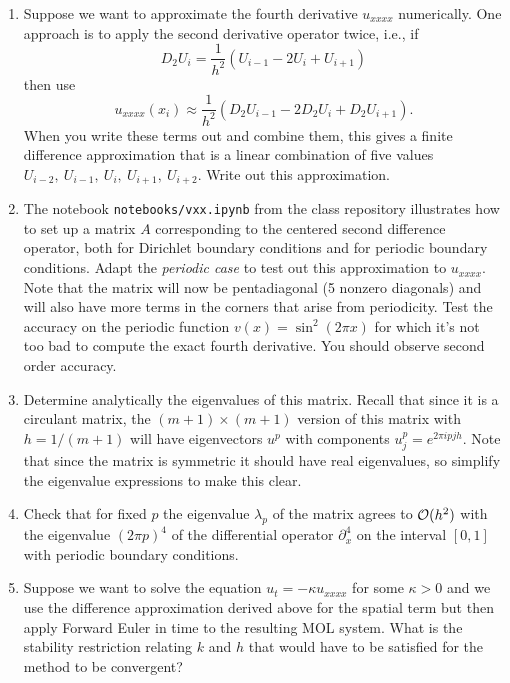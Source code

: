 \documentclass[10pt]{article}
\begin{document}
\begin{enumerate} 
\item Suppose we want to approximate the fourth derivative $u_{xxxx}$
numerically. One approach is to apply the second derivative operator twice,
i.e., if 
\[
D_2 U_i = \frac 1 {h^2}(U_{i-1} - 2U_i + U_{i+1})
\]
then use
\[
u_{xxxx}(x_i) \approx \frac 1 {h^2}(D_2 U_{i-1} - 2D_2 U_i + D_2 U_{i+1}).
\]
When you write these terms out and combine them, this gives a finite
difference approximation that is a linear combination of five values
$U_{i-2},~U_{i-1},~U_i,~U_{i+1},~U_{i+2}$.  
Write out this approximation.


\item The notebook \verb+notebooks/vxx.ipynb+ from the
class repository illustrates how to set up a matrix $A$ corresponding
to the centered second difference operator, both for Dirichlet
boundary conditions and for periodic boundary conditions.  Adapt
the {\it periodic case} to test out this approximation to $u_{xxxx}$.
Note that the matrix will now be pentadiagonal (5 nonzero diagonals)
and will also have more terms in the corners that arise from periodicity.
Test the accuracy on the periodic function $v(x) = \sin^2(2\pi x)$
for which it's not too bad to compute the exact fourth derivative.  
You should observe second order accuracy.

\item Determine analytically the eigenvalues of this matrix.  Recall that
since it is a circulant matrix, the $(m+1)\times (m+1)$ version of this
matrix with $h=1/(m+1)$  will have eigenvectors $u^p$ with components 
$u^p_j = e^{2\pi i pjh}$.  Note that since the matrix is symmetric it should
have real eigenvalues, so simplify the eigenvalue expressions to make this
clear. 

\item Check that for fixed $p$ the eigenvalue $\lambda_p$ of the matrix
agrees to ${\mathcal O}(h^2)$  with the eigenvalue $(2\pi p)^4$ of the differential
operator $\partial_x^4$ on the interval $[0,1]$ with periodic boundary
conditions.

\item Suppose we want to solve the equation $u_t = -\kappa u_{xxxx}$
for some $\kappa >0$ and we use the difference approximation derived
above for the spatial term but then apply Forward Euler in time to
the resulting MOL system.  What is the stability restriction relating
$k$ and $h$ that would have to be satisfied for the method to be
convergent?  

\end{enumerate}




\end{document}
